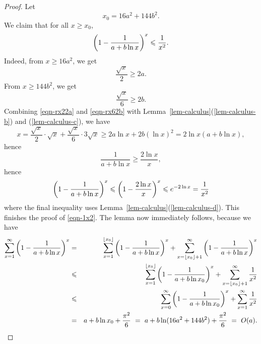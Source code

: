 \begin{proof}
  Let
  \begin{equation}
    x_0 = 16a^2 + 144b^2.\label{eqn-x0}
  \end{equation}
  We claim that for all $x \geq x_0$, 
  \begin{equation}
    \left(1-\frac{1}{a+b\ln x}\right)^x \leqslant \frac{1}{x^2}. \label{eqn-1x2}
  \end{equation}
  Indeed, from $x\geq 16a^2$, we get
  \begin{equation}\label{eqn-rx22a}
    \frac{\sqrt{x}}{2} \geq 2a.
  \end{equation}
  From $x\geq 144b^2$, we get 
  \begin{equation}\label{eqn-rx62b}
    \frac{\sqrt{x}}{6} \geq 2b.
  \end{equation}
  Combining {\eqref{eqn-rx22a}} and {\eqref{eqn-rx62b}} with
  Lemma~\ref{lem-calculus}(\ref{lem-calculus-b}) and
  (\ref{lem-calculus-c}), we have
  \[
    x = \frac{\sqrt x}{2}\cdot \sqrt x + \frac{\sqrt
      x}{6}\cdot 3\sqrt x
    \geq 2a\ln x + 2b(\ln x)^2 = 2\ln x(a+b\ln x),
  \]
  hence
  \[
  \frac{1}{a + b \ln x} \geq \frac{2\ln x}{x},
  \]
  hence
  \[ 
  \left(1-\frac{1}{a + b \ln x}\right)^x \leqslant \left(1-\frac{2\ln x}{x}\right)^x
  \leqslant e^{-2\ln x} = \frac{1}{x^2}
  \]
  where the final inequality uses
  Lemma~\ref{lem-calculus}(\ref{lem-calculus-d}). This finishes the
  proof of {\eqref{eqn-1x2}}. The lemma now immediately follows,
  because we have 
  \begin{eqnarray}
    \sum_{x=1}^{\infty} \left(1-\frac{1}{a+b\ln x}\right)^x
    &=& \sum_{x=1}^{\lfloor x_0\rfloor} \left(1-\frac{1}{a+b\ln x}\right)^x +
    \sum_{x=\lfloor x_0\rfloor+1}^{\infty} \left(1-\frac{1}{a+b\ln x}\right)^x\nonumber\\
    &\leqslant& \sum_{x=1}^{\lfloor x_0\rfloor} \left(1-\frac{1}{a+b\ln x_0}\right)^x +
    \sum_{x=\lfloor x_0\rfloor+1}^{\infty} \frac{1}{x^2}\nonumber\\
    &\leqslant& \sum_{x=0}^{\infty} \left(1-\frac{1}{a+b\ln x_0}\right)^x +
    \sum_{x=1}^{\infty} \frac{1}{x^2}\nonumber \\
    &=& a+b\ln x_0 + \frac{\pi^2}{6}
    ~=~  a+b\ln (16a^2 + 144b^2) + \frac{\pi^2}{6} ~=~ O(a).\nonumber
  \end{eqnarray}
\end{proof}
